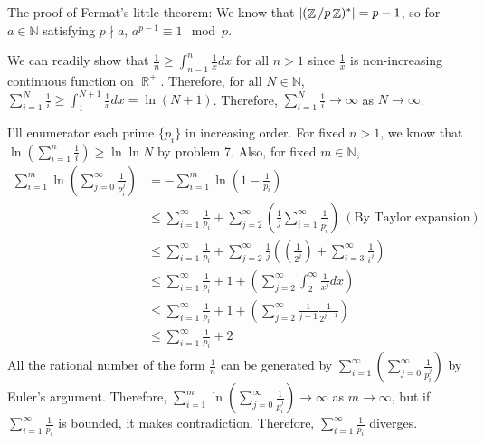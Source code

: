 \documentclass[12pt]{article}
\newenvironment{problem}[2][Problem]{\begin{trivlist}
\item[\hskip \labelsep {\bfseries #1}\hskip \labelsep {\bfseries #2.}]}{\end{trivlist}}
\DeclareMathOperator{\rr}{\mathbb{R}}
\DeclareMathOperator{\zz}{\mathbb{Z}}
\begin{document}
The proof of Fermat's little theorem: We know that $\abs{(\zz/p\zz)^*}=p-1$, so for $a\in \mathbb{N}$ satisfying $p\nmid a$, $a^{p-1}\equiv 1 \mod p$.

\begin{problem}{7}
\end{problem}
We can readily show that $\frac{1}{n}\geq \int_{n-1}^{n} \frac{1}{x} dx$ for all $n>1$ since $\frac{1}{x}$ is non-increasing continuous function on $\rr^+$. Therefore, for all $N\in \mathbb{N}$, $\sum\limits_{i=1}^N \frac{1}{i}\geq \int_1^{N+1}\frac{1}{x} dx=\ln(N+1)$. Therefore, $\sum\limits_{i=1}^N \frac{1}{i}\rightarrow \infty$ as $N\rightarrow \infty$.


\newpage
\begin{problem}{8}
\end{problem}
I'll enumerator each prime $\{p_i\}$ in increasing order. For fixed $n>1$, we know that $\ln \left(\sum\limits_{i=1}^n \frac{1}{i}\right)\geq \ln \ln N$ by problem 7. Also, for fixed $m\in \mathbb{N}$,
\begin{equation*}
\begin{split}
\sum\limits_{i=1}^m \ln \left(\sum\limits_{j=0}^\infty \frac{1}{p_i^j}\right)&=-\sum\limits_{i=1}^m \ln \left(1-\frac{1}{p_i}\right) \\
&\leq \sum\limits_{i=1}^\infty \frac{1}{p_i} + \sum\limits_{j=2}^\infty \left(\frac{1}{j}\sum\limits_{i=1}^\infty \frac{1}{p^j_i}\right)~(\textrm{By Taylor expansion}) \\
&\leq \sum\limits_{i=1}^\infty \frac{1}{p_i} + \sum\limits_{j=2}^\infty \frac{1}{j}\left(\left(\frac{1}{2^j}\right)+\sum\limits_{i=3}^\infty \frac{1}{i^j}\right) \\
&\leq \sum\limits_{i=1}^\infty \frac{1}{p_i} + 1+\left(\sum\limits_{j=2}^\infty \int_2^\infty \frac{1}{x^j} dx \right) \\
&\leq \sum\limits_{i=1}^\infty \frac{1}{p_i} + 1+\left(\sum\limits_{j=2}^\infty \frac{1}{j-1}\frac{1}{2^{j-1}}\right) \\
&\leq \sum\limits_{i=1}^\infty \frac{1}{p_i} + 2
\end{split}
\end{equation*}
All the rational number of the form $\frac{1}{n}$ can be generated by $\sum\limits_{i=1}^\infty\left(\sum\limits_{j=0}^\infty \frac{1}{p_i^j}\right)$ by Euler's argument. Therefore, $\sum\limits_{i=1}^m\ln\left(\sum\limits_{j=0}^\infty \frac{1}{p_i^j}\right)\rightarrow \infty$ as $m\rightarrow \infty$, but if $\sum\limits_{i=1}^\infty \frac{1}{p_i}$ is bounded, it makes contradiction. Therefore, $\sum\limits_{i=1}^\infty \frac{1}{p_i}$ diverges.
\end{document}
